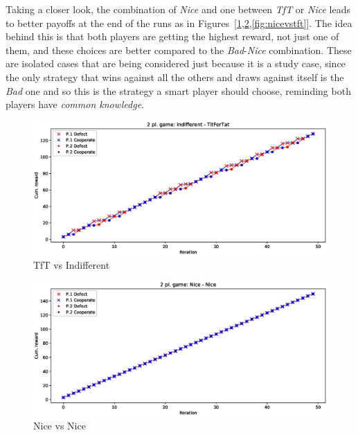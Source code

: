 \documentclass[journal,a4paper,10pt,twoside]{IEEEtran} %
\begin{document}
Taking a closer look, the combination of \textit{Nice} and one between \textit{TfT} or \textit{Nice} leads to better payoffs at the end of the runs as in Figures~[\ref{fig:tftvsindiff},\ref{fig:nicevsnice},\ref{fig:nicevstft}]. The idea behind this is that both players are getting the highest reward, not just one of them, and these choices are better compared to the \textit{Bad}-\textit{Nice} combination.
These are isolated cases that are being considered just because it is a study case, since the only strategy that wins against all the others and draws against itself is the \textit{Bad} one and so this is the strategy a smart player should choose, reminding both players have \textit{common knowledge}.

\begin{figure}[!ht]
    \centering
    \includegraphics[width=1\columnwidth]{../img/ipd2p/ipd2p-rewards-Indifferent-TitForTat}
    \caption{TfT vs Indifferent}
    \label{fig:tftvsindiff}
\end{figure}

\begin{figure}[!ht]
    \centering
    \includegraphics[width=1\columnwidth]{../img/ipd2p/ipd2p-rewards-Nice-Nice}
    \caption{Nice vs Nice}
    \label{fig:nicevsnice}
\end{figure}
\end{document}
